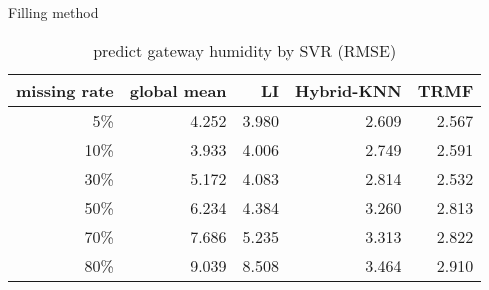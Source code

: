 \begin{table}[htbp]
\centering
\caption{predict gateway humidity by SVR (RMSE) }
\label{table: SVR}
   Filling method
\begin{tabular}{ r | r r r r}
        missing rate&global mean     &LI   &Hybrid-KNN &TRMF\\ \hline
        5\%&4.252&3.980&2.609&2.567\\
        10\%    &3.933 &4.006&2.749&2.591\\
        30\%    &5.172&4.083&2.814&2.532\\
        50\%    &6.234&4.384&3.260&2.813\\
        70\%   &7.686&5.235&3.313&2.822\\
        80\%  &9.039&8.508&3.464&2.910\\
\end{tabular}
\end{table}
